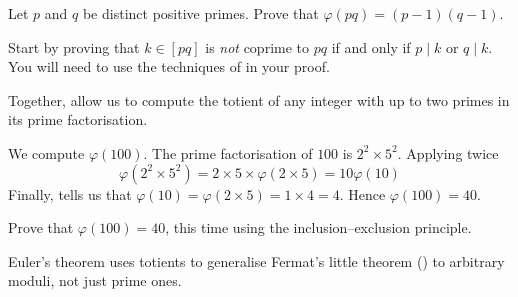 \begin{exercise}
\label{exTotientOfProductOfTwoPrimes}
Let $p$ and $q$ be distinct positive primes. Prove that $\varphi(pq)=(p-1)(q-1)$.
\begin{backhint}
Start by proving that $k \in [pq]$ is \textit{not} coprime to $pq$ if and only if $p \mid k$ or $q \mid k$. You will need to use the techniques of  in your proof.
\end{backhint}
\end{exercise}

Together,  allow us to compute the totient of any integer with up to two primes in its prime factorisation.

\begin{example}
\label{exTotientOfOneHundred}
We compute $\varphi(100)$. The prime factorisation of $100$ is $2^2 \times 5^2$. Applying  twice
\[ \varphi(2^2 \times 5^2) = 2 \times 5 \times \varphi(2 \times 5) = 10\varphi(10) \]
Finally,  tells us that $\varphi(10) = \varphi(2 \times 5) = 1 \times 4 = 4$. Hence $\varphi(100) = 40$.
\end{example}

\begin{exercise}
Prove that $\varphi(100)=40$, this time using the inclusion--exclusion principle.
\end{exercise}

Euler's theorem uses totients to generalise Fermat's little theorem () to arbitrary moduli, not just prime ones.


